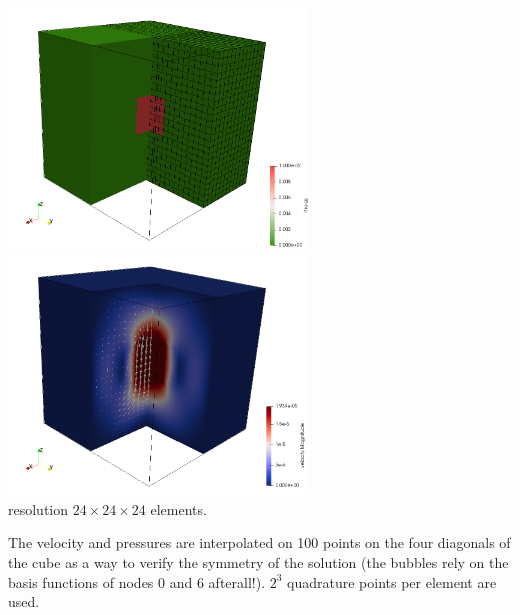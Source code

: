 \begin{center}
\includegraphics[width=8cm]{python_codes/fieldstone_82/results/bench4/rho}
\includegraphics[width=8cm]{python_codes/fieldstone_82/results/bench4/vel}\\
{\captionfont resolution $24\times 24 \times 24$ elements.}
\end{center}

The velocity and pressures are interpolated on 100 points on the four diagonals of the cube
as a way to verify the symmetry of the solution (the bubbles rely on the basis 
functions of nodes 0 and 6 afterall!). $2^3$ quadrature points per element are used. 

